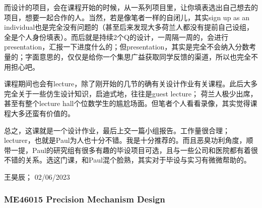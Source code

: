 而设计的项目，会在课程开始的时候，从一系列项目里，让你填表选出自己想去的项目，想要一起合作的人。当然，若是像笔者一样的自闭儿，其实sign up as an individual也是完全没有问题的（甚至后来发现大多荷兰人都没有提前自己设组，全是个人身份填表）。而后就是持续2个Q的设计，一周隔一周的，会进行presentation，汇报一下进度什么的；但presentation，其实是完全不会纳入分数考量的；字面意思的，仅仅是给你一个集思广益获取同学反馈的渠道，所以也完全不用担心吧。

课程期间也会有lecture，除了刚开始的几节的确有关设计作业有关课程。此后大多完全关于一些仿生设计知识，启迪式地，往往是guest lecture； 荷兰人极少出席，甚至有整个lecture hall个位数学生的尴尬场面。但笔者个人看看录像，其实觉得课程大多还蛮有价值的。

总之，这课就是一个设计作业，最后上交一篇小组报告。工作量很合理；lecturer，也就是Paul为人也十分不错。我是十分推荐的。而且恶臭功利角度，顺带一提，Paul的研究组有很多有趣的毕设项目可选，且与一些公司和医院都有着很不错的关系。选这门课，和Paul混个脸熟，其实对于毕设与实习有微微帮助的。
\begin{flushright}
王昊辰； 02/06/2023
\end{flushright}

\subsubsection{ME46015 Precision Mechanism Design}



